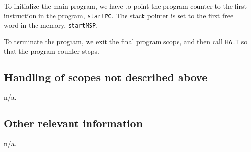 \documentclass[11pt]{article}
\begin{document}
To initialize the main program, we have to point the program counter to the first instruction in the program, \texttt{startPC}. The stack pointer is set to the first free word in the memory, \texttt{startMSP}.

To terminate the program, we exit the final program scope, and then call \texttt{HALT} so that the program counter stops.

\subsection{Handling of scopes not described above}

n/a.

\subsection{Other relevant information}

n/a.
\end{document}
